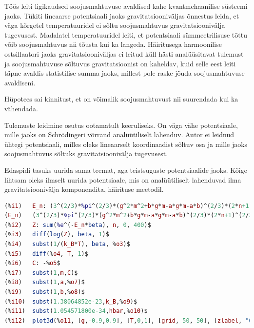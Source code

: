 \documentclass{trkut}%
\begin{document}
Töös leiti ligikaudsed soojusmahtuvuse avaldised kahe kvantmehaanilise süsteemi jaoks.
Tükiti lineaarse potentsiaali jaoks gravitatsiooniväljas õnnestus leida, et väga kõrgetel temperatuuridel ei sõltu soojusmahtuvus gravitatsioonivälja tugevusest. Madalatel temperatuuridel leiti, et potentsiaali sümmeetrilisuse tõttu võib soojusmahtuvus nii tõusta kui ka langeda. Häiritusega harmoonilise ostsillaatori jaoks gravitatsiooniväljas ei leitud küll hästi analüüsitavat tulemust ja soojusmahtuvuse sõltuvus gravitatsioonist on kaheldav, kuid selle eest leiti täpne avaldis statistilise summa jaoks, millest pole raske jõuda soojusmahtuvuse avaldiseni.

Hüpotees sai kinnitust, et on võimalik soojusmahtuvust nii suurendada kui ka vähendada.

Tulemuste leidmine osutus ootamatult keeruliseks.
On väga vähe potentsiaale, mille jaoks on Schrödingeri võrrand analüütiliselt lahenduv.
Autor ei leidnud ühtegi potentsiaali, milles oleks lineaarselt koordinaadist sõltuv osa ja mille jaoks soojusmahtuvus sõltuks gravitatsioonivälja tugevusest.

Edaspidi tasuks uurida sama teemat, aga teistsuguste potentsiaalide jaoks. Kõige lihtsam oleks ilmselt uurida potentsiaale, mis on analüütiliselt lahenduvad ilma gravitatsioonivälja komponendita, häirituse meetodil.

\printbibliography
{} \label{maximalisa}
\begin{lstlisting}[language=Maxima, breaklines=true]
(%i1)	E_n: (3^(2/3)*%pi^(2/3)*(g^2*m^2+b*g*m-a*g*m-a*b)^(2/3)*(2*n+1)^(2/3)*hbar^(2/3))/(2^(5/3)*(b+a)^(2/3)*m^(1/3));
(E_n)	(3^(2/3)*%pi^(2/3)*(g^2*m^2+b*g*m-a*g*m-a*b)^(2/3)*(2*n+1)^(2/3)*hbar^(2/3))/(2^(5/3)*(b+a)^(2/3)*m^(1/3))
(%i2)	Z: sum(%e^(-E_n*beta), n, 0, 400)$
(%i3)	diff(log(Z), beta, 1)$
(%i4)	subst(1/(k_B*T), beta, %o3)$
(%i5)	diff(%o4, T, 1)$
(%i6)	C: -%o5$
(%i7)	subst(1,m,C)$
(%i8)	subst(1,a,%o7)$
(%i9)	subst(1,b,%o8)$
(%i10)	subst(1.38064852e-23,k_B,%o9)$
(%i11)	subst(1.054571800e-34,hbar,%o10)$
(%i12)	plot3d(%o11, [g,-0.9,0.9], [T,0,1], [grid, 50, 50], [zlabel, "C"], [gnuplot_pm3d,true]);
\end{lstlisting}

\kinnitusleht
\end{document}
